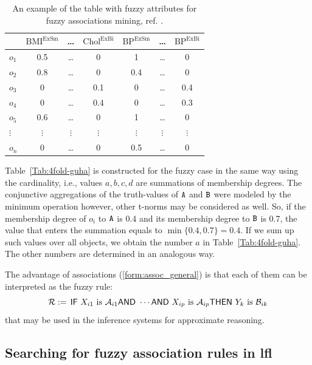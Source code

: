 \documentclass[review]{elsarticle}
\newcommand{\pkg}[1]{\textbf{#1}}
\newcommand{\lingterm}[1]{\text{\sf #1}}
\newcommand{\defeq}{\mathrel{:=}\,}
\newcommand{\LpredC}[2]{#1\text{ is }#2}
\newcommand{\IFRuleMore}[6]{\lingterm{IF } \LpredC{#1}{#2} \lingterm{ AND
}\cdots \lingterm{ AND }\LpredC{#3}{#4} \lingterm{ THEN }
\LpredC{#5}{#6}}
\begin{document}
\begin{table}[ht]
  \centering
\begin{tabular}{|l| c c c |c c c|}
    \hline
          & $\mathrm{BMI}^{\mathrm{Ex
Sm}}$ &  \ldots & $\mathrm{Chol}^{\mathrm{Ex Bi}}$ & $\mathrm{BP}^{\mathrm{Ex Sm}}$ & \ldots & $\mathrm{BP}^{\mathrm{Ex Bi}}$\\
    \hline
    $o_1$ & 0.5 & \ldots & 0 & 1 & \ldots & 0\\
    $o_2$ & 0.8 & \ldots & 0  & 0.4 & \ldots & 0\\
    $o_3$ & 0 &  \ldots & 0.1  & 0 & \ldots & 0.4\\
    $o_4$ & 0 &  \ldots & 0.4  & 0 & \ldots & 0.3\\
    $o_5$ & 0.6  & \ldots & 0  & 1 & \ldots & 0\\
    $\vdots$  & $\vdots$ & $\vdots$ & $\vdots$ & $\vdots$ & $\vdots$& $\vdots$\\
    $o_n$ & 0 & \ldots & 0  & 0.5 & \ldots & 0 \\
    \hline
\end{tabular}
\caption{An example of the table with fuzzy attributes for fuzzy associations mining, ref. \cite{StepBurda:FRBE_FSS}. } \label{Tab:FuzzyGuhaComplete}
\end{table}



Table~\ref{Tab:4fold-guha} is
constructed for the fuzzy case in the same way using the cardinality, i.e., values $a,b,c,d$ are summations of membership degrees. The conjunctive aggregations of the truth-values of 
${\tt A}$ and ${\tt B}$ 
were modeled by the minimum operation however, other t-norms \citep{KlementMesiarPap00} may be considered as well. So, if the membership degree of $o_i$ to ${\tt A}$ is
0.4 and its membership degree to ${\tt B}$ is 0.7, the value that
enters the summation equals to $\min\{ 0.4,0.7\} = 0.4$. If we sum up such values over all objects, we obtain the number $a$ in
Table~\ref{Tab:4fold-guha}. The other numbers are determined in an analogous way. 


The advantage of associations (\ref{form:assoc_general}) is that each of them can be interpreted as the fuzzy rule:
$$\mathcal{R}\defeq\IFRuleMore{X_{i1}}{\mathcal{A}_{i1}}{X_{ip}}{\mathcal{A}_{ip}}{Y_k}{\mathcal{B}_{ik}}$$ that may be used in the inference systems for approximate reasoning. 



\subsection[Searching for fuzzy association rules in lfl]{Searching for fuzzy association rules in \pkg{lfl}}
\end{document}
